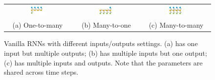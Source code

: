 \begin{figure}
\centering
\begin{tabular}{ccc}
\includegraphics[width = 0.3\textwidth]{RNN1-1} & \includegraphics[width = 0.3\textwidth]{RNN1-2} & \includegraphics[width = 0.3\textwidth]{RNN1-3} \tabularnewline
(a) One-to-many & (b) Many-to-one & (c) Many-to-many
\end{tabular}
\caption{Vanilla RNNs with different inputs/outputs settings. (a) has one input but multiple outputs; (b) has multiple inputs but one output; (c) has multiple inputs and outputs. Note that the parameters are shared across time steps.}\label{fig:RNN1}
\end{figure}

